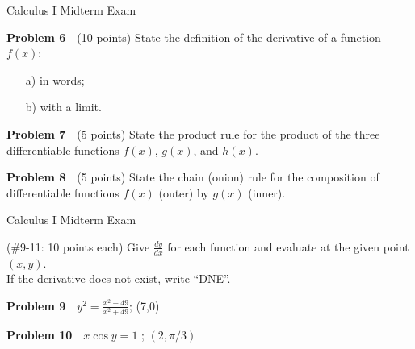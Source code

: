 \documentclass[10pt]{article}
\newcommand{\prob}[1]{\vspace{5mm} \noindent \textbf{Problem #1} \,\,}
\newcommand{\header}{\begin{center}
Calculus I Midterm Exam 
\end{center}
}
\begin{document}

\pagebreak

\header


\prob{6} (10 points) State the definition of the derivative of a function $f(x)$: %
\begin{itemize}
\item[a) ] in words;
\item[b) ] with a limit.
\end{itemize}

\vspace{50mm}

\prob{7} (5 points) State the product rule for the product of the three differentiable functions $f(x)$, $g(x)$, and $h(x)$. 

\vspace{50mm}

\prob{8} (5 points) State the chain (onion) rule for the composition of differentiable functions $f(x)$ (outer) by $g(x)$ (inner). 


\pagebreak

\header

\noindent (\#9-11: 10 points each) Give $\frac{dy}{dx}$ for each function and evaluate at the given point $(x,y)$. \\ If the derivative does not exist, write ``DNE''. %

\prob{9} $y^2 = \frac{x^2 - 49}{x^2 + 49}$; (7,0) \\ %

\vspace{40mm}





\prob{10} $x \cos y = 1$ ; $(2, \pi/3)$ \\ %

\vspace{40mm}

\end{document}
